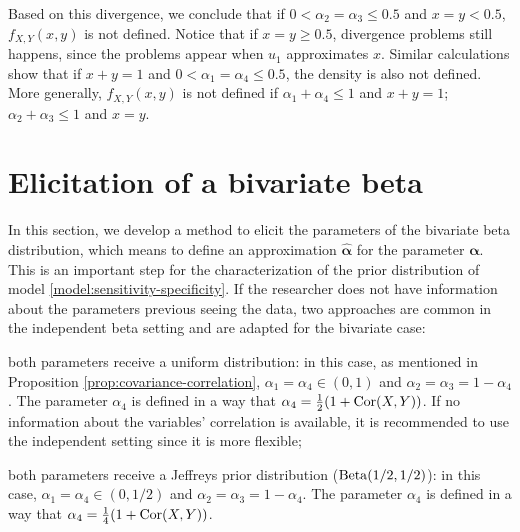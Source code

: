 Based on this divergence, we conclude that if $0 < \alpha_2 = \alpha_3 \le 0.5$
and $x = y < 0.5$, $f_{X,Y}(x,y)$ is not defined. Notice that if $x = y \ge
0.5$, divergence problems still happens, since the problems appear when $u_1$ approximates $x$. Similar calculations show that if $x + y = 1$ and $0 < \alpha_1 = \alpha_4 \le 0.5$, the density is also
not defined. More generally, $f_{X,Y}(x,y)$ is not defined if $\alpha_1 +
\alpha_4 \le 1$ and $x + y = 1$; $\alpha_2 + \alpha_3 \le 1$ and $x = y$.

\section{Elicitation of a bivariate beta}
\label{sec:elicitation-bivariate-beta}

In this section, we develop a method to elicit the parameters of the bivariate
beta distribution, which means to define an approximation
$\hat{\boldsymbol{\alpha}}$ for the parameter $\boldsymbol{\alpha}$. 
This is an important step for the characterization of the prior distribution of model
\eqref{model:sensitivity-specificity}. If the researcher does not have
information about the parameters previous seeing the data, two approaches
are common in the independent beta setting and are adapted for the bivariate 
case:

\begin{alineas}
  \item both parameters receive a uniform distribution: in this case, as
  mentioned in Proposition \ref{prop:covariance-correlation}, $\alpha_1 =
  \alpha_4 \in (0,1)$ and $\alpha_2 = \alpha_3 = 1 - \alpha_4$. The parameter
  $\alpha_4$ is defined in a way that $\alpha_4 = \frac{1}{2}(1 + \operatorname{Cor}(X,Y))$.
  If no information about the variables' correlation is available, it is recommended to use
  the independent setting since it is more flexible;
  \item both parameters receive a Jeffreys prior distribution
  ($\operatorname{Beta}(1/2,1/2)$): in this case,  $\alpha_1 =
  \alpha_4 \in (0,1/2)$ and $\alpha_2 = \alpha_3 = 1 - \alpha_4$. The parameter
  $\alpha_4$ is defined in a way that $\alpha_4 = \frac{1}{4}(1 + \operatorname{Cor}(X,Y))$.
\end{alineas}

